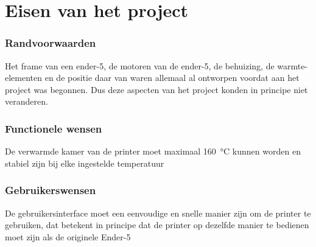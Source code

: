 \chapter{Eisen van het project}
\label{Eisen_van_het_project}

\subsection{Randvoorwaarden}

Het frame van een ender-5, de motoren van de ender-5, de behuizing, de
warmte-elementen en de positie daar van waren allemaal al ontworpen voordat aan
het project was begonnen. Dus deze aspecten van het project konden in principe niet
veranderen.

\subsection{Functionele wensen}

De verwarmde kamer van de printer moet maximaal \SI{160}{\celsius} kunnen
worden en stabiel zijn bij elke ingestelde temperatuur

\subsection{Gebruikerswensen}

De gebruikersinterface moet een eenvoudige en snelle manier zijn om de printer
te gebruiken, dat betekent in principe dat de printer op dezelfde manier te
bedienen moet zijn als de originele Ender-5


